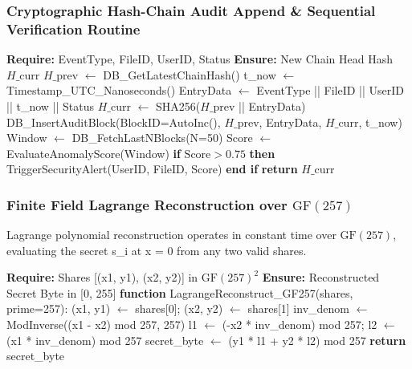 \documentclass[5p,times]{elsarticle}
\begin{document}
\subsubsection{Cryptographic Hash-Chain Audit Append \& Sequential Verification Routine}

\begin{algorithm}[!ht]
\caption{Cryptographic Hash-Chain Audit Append \& Sequential Verification Routine}
\begin{algorithmic}[1]
  \STATE \textbf{Require:} EventType, FileID, UserID, Status
  \STATE \textbf{Ensure:} New Chain Head Hash $H\_{\text{curr}}$
  \STATE $H\_{\text{prev}}$ $\leftarrow$ DB\_GetLatestChainHash()
  \STATE t\_now $\leftarrow$ Timestamp\_UTC\_Nanoseconds()
  \STATE EntryData $\leftarrow$ EventType || FileID || UserID || t\_now || Status
  \STATE $H\_{\text{curr}}$ $\leftarrow$ SHA256($H\_{\text{prev}}$ || EntryData)
  \STATE DB\_InsertAuditBlock(BlockID=AutoInc(), $H\_{\text{prev}}$, EntryData, $H\_{\text{curr}}$, t\_now)
  \STATE Window $\leftarrow$ DB\_FetchLastNBlocks(N=50)
  \STATE Score $\leftarrow$ EvaluateAnomalyScore(Window)
  \STATE \textbf{if} $\text{Score} > 0.75$ \textbf{then} TriggerSecurityAlert(UserID, FileID, Score) \textbf{end if}
  \STATE \textbf{return} $H\_{\text{curr}}$
\end{algorithmic}
\end{algorithm}


\subsubsection{Finite Field Lagrange Reconstruction over $\text{GF}(257)$}

Lagrange polynomial reconstruction operates in constant time over $\text{GF}(257)$, evaluating the secret s\_i at x = 0 from any two valid shares.

\begin{algorithm}[!ht]
\caption{Finite Field Lagrange Reconstruction over $\text{GF}(257)$}
\begin{algorithmic}[1]
  \STATE \textbf{Require:} Shares [(x1, y1), (x2, y2)] in $\text{GF}(257)^2$
  \STATE \textbf{Ensure:} Reconstructed Secret Byte in [0, 255]
  \STATE \textbf{function} LagrangeReconstruct\_GF257(shares, prime=257):
  \STATE (x1, y1) $\leftarrow$ shares[0]; (x2, y2) $\leftarrow$ shares[1]
  \STATE inv\_denom $\leftarrow$ ModInverse((x1 - x2) mod 257, 257)
  \STATE l1 $\leftarrow$ (-x2 * inv\_denom) mod 257; l2 $\leftarrow$ (x1 * inv\_denom) mod 257
  \STATE secret\_byte $\leftarrow$ (y1 * l1 + y2 * l2) mod 257
  \STATE \textbf{return} secret\_byte
\end{algorithmic}
\end{algorithm}
\end{document}
